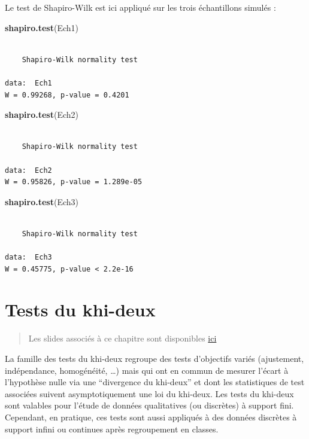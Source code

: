 \documentclass[
]{book}
\newenvironment{Shaded}{\begin{snugshade}}{\end{snugshade}}
\newcommand{\KeywordTok}[1]{\textcolor[rgb]{0.13,0.29,0.53}{\textbf{#1}}}
\newcommand{\NormalTok}[1]{#1}
\theoremstyle{definition}
\theoremstyle{definition}
\theoremstyle{definition}
\theoremstyle{definition}
\theoremstyle{remark}
\begin{document}
Le test de Shapiro-Wilk est ici appliqué sur les trois échantillons simulés :

\begin{Shaded}
\begin{Highlighting}[]
\KeywordTok{shapiro.test}\NormalTok{(Ech1)}
\end{Highlighting}
\end{Shaded}

\begin{verbatim}

    Shapiro-Wilk normality test

data:  Ech1
W = 0.99268, p-value = 0.4201
\end{verbatim}

\begin{Shaded}
\begin{Highlighting}[]
\KeywordTok{shapiro.test}\NormalTok{(Ech2)}
\end{Highlighting}
\end{Shaded}

\begin{verbatim}

    Shapiro-Wilk normality test

data:  Ech2
W = 0.95826, p-value = 1.289e-05
\end{verbatim}

\begin{Shaded}
\begin{Highlighting}[]
\KeywordTok{shapiro.test}\NormalTok{(Ech3)}
\end{Highlighting}
\end{Shaded}

\begin{verbatim}

    Shapiro-Wilk normality test

data:  Ech3
W = 0.45775, p-value < 2.2e-16
\end{verbatim}

\hypertarget{tests-du-khi-deux}{%
\chapter{Tests du khi-deux}\label{tests-du-khi-deux}}

\begin{quote}
Les slides associés à ce chapitre sont disponibles \href{image/SlidesTestsPart2.pdf}{ici}
\end{quote}

La famille des tests du khi-deux regroupe des tests d'objectifs variés (ajustement, indépendance, homogénéité, \ldots)
mais qui ont en commun de mesurer l'écart à l'hypothèse nulle via une ``divergence du khi-deux'' et dont les statistiques de test associées suivent asymptotiquement une loi du khi-deux.
Les tests du khi-deux sont valables pour l'étude de données qualitatives (ou discrètes) à support fini. Cependant, en pratique, ces tests sont aussi appliqués à des données discrètes à support infini ou continues après regroupement en classes.
\end{document}
